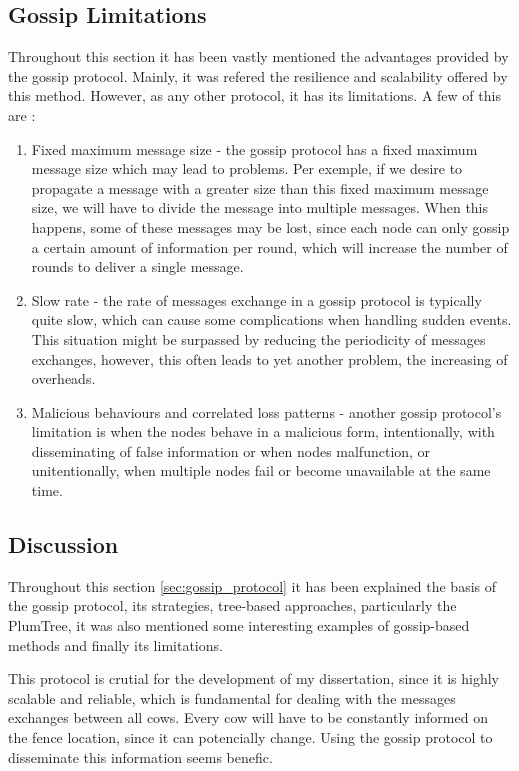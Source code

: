 \subsection{Gossip Limitations}
\label{subsec:gossip_limitations}
Throughout this section it has been vastly mentioned the advantages provided by the gossip
protocol. Mainly, it was refered the resilience and scalability offered by this method.
However, as any other protocol, it has its limitations. A few of this are \cite{Birman2007}:
\begin{enumerate}
    \item Fixed maximum message size - the gossip protocol has a fixed maximum message size
          which may lead to problems. Per exemple, if we desire to propagate a message with a
          greater size than this fixed maximum message size, we will have to divide the message
          into multiple messages. When this happens, some of these messages may be lost, since
          each node can only gossip a certain amount of information per round, which will
          increase the number of rounds to deliver a single message.
    \item Slow rate - the rate of messages exchange in a gossip protocol is typically quite
          slow, which can cause some complications when handling sudden events. This situation
          might be surpassed by reducing the periodicity of messages exchanges, however, this
          often leads to yet another problem, the increasing of overheads.
    \item Malicious behaviours and correlated loss patterns - another gossip protocol's limitation
          is when the nodes behave in a malicious form, intentionally, with disseminating of
          false information or when nodes malfunction, or unitentionally, when multiple nodes
          fail or become unavailable at the same time.
\end{enumerate}


\subsection{Discussion}
\label{subsec:gossip_discussion}
Throughout this section \ref{sec:gossip_protocol} it has been explained the basis of the
gossip protocol, its strategies, tree-based approaches, particularly the PlumTree, it was
also mentioned some interesting examples of gossip-based methods and finally its limitations.

This protocol is crutial for the development of my dissertation, since it is highly scalable
and reliable, which is fundamental for dealing with the messages exchanges between all cows.
Every cow will have to be constantly informed on the fence location, since it can potencially
change. Using the gossip protocol to disseminate this information seems benefic.

